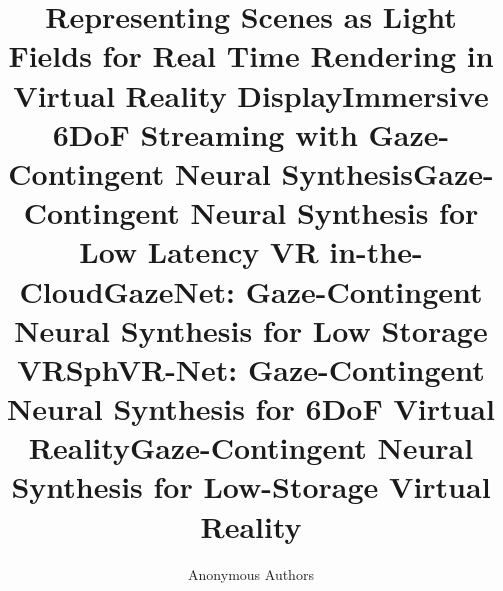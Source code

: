 \title{Representing Scenes as Light Fields for Real Time Rendering in Virtual Reality Display}
\title{Immersive 6DoF Streaming with Gaze-Contingent Neural Synthesis} 
\title{Gaze-Contingent Neural Synthesis for Low Latency VR in-the-Cloud} 
\title{GazeNet: Gaze-Contingent Neural Synthesis for Low Storage VR} 
\title{SphVR-Net: Gaze-Contingent Neural Synthesis for 6DoF Virtual Reality}
\title{Gaze-Contingent Neural Synthesis for Low-Storage Virtual Reality} 


\author{Anonymous Authors}
